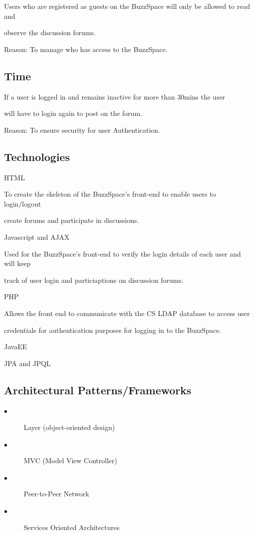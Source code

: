 \documentclass[a4paper,12pt]{report}
\begin{document}
	\begin{description}
	\item[$\bullet$] 
Users who are registered as guests on the BuzzSpace will only be allowed to read and \item observe the discussion forums. 
\item Reason: To manage who has access to the BuzzSpace.
\end{description}

\subsection{Time}
	\begin{description}
\item If a user is logged in and remains inactive for more than 30mins the user 
\item will have to login again to post on the forum. 
\item  Reason: To ensure security for user Authentication. 
\end{description}

\subsection{Technologies}
	\begin{description}
\item[$\bullet$] HTML
\item To create the skeleton of the BuzzSpace's front-end to enable users to login/logout
\item create forums and participate in discussions.
\item [$\bullet$] Javascript and  AJAX
\item Used for the BuzzSpace's front-end to verify the login details of each user and will keep 
\item track of user login and particiaptions on discussion forums.
\item [$\bullet$] PHP
\item Allows the front end to communicate with the CS LDAP database to access user \item credentials for authentication purposes for logging in to the BuzzSpace.
\item [$\bullet$] JavaEE
\item [$\bullet$] JPA and JPQL
\end{description}

\subsection{Architectural Patterns/Frameworks}
	\begin{description}
\item[$\bullet$] Layer (object-oriented design)
\item[$\bullet$] MVC (Model View Controller)
\item[$\bullet$] Peer-to-Peer Network
\item[$\bullet$] Services Oriented Architectures
\end{description}
\end{document}
